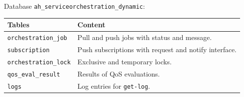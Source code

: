\documentclass[a4paper]{arrowhead}
\begin{document}
Database \texttt{ah\_serviceorchestration\_dynamic}:

\noindent\begin{longtable}{| p{6.4cm} | p{8.8cm} |} \hline
\rowcolor{gray!33} Tables & Content \\ \hline \endhead
\texttt{orchestration\_\allowbreak{}job} & Pull and push jobs with status and message. \\ \hline
\texttt{subscription} & Push subscriptions with request and notify interface. \\ \hline
\texttt{orchestration\_\allowbreak{}lock} & Exclusive and temporary locks. \\ \hline
\texttt{qos\_\allowbreak{}eval\_\allowbreak{}result} & Results of QoS evaluations. \\ \hline
\texttt{logs} & Log entries for \texttt{get-\allowbreak{}log}. \\ \hline
\end{longtable}
\end{document}
